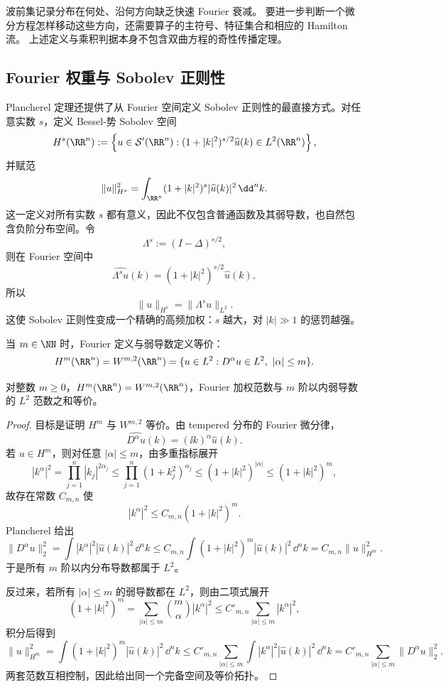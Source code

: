 \begin{note}[波前集与奇性传播的区别]
波前集记录分布在何处、沿何方向缺乏快速 Fourier 衰减。
要进一步判断一个微分方程怎样移动这些方向，还需要算子的主符号、特征集合和相应的 Hamilton 流。
上述定义与乘积判据本身不包含双曲方程的奇性传播定理。
\end{note}

\subsection{Fourier 权重与 Sobolev 正则性}
Plancherel 定理还提供了从 Fourier 空间定义 Sobolev 正则性的最直接方式。对任意实数 $s$，定义 Bessel-势 Sobolev 空间
\begin{equation*}H^s(\RR^n)
:=\left\{u\in\mathcal S'(\RR^n):
(1+|k|^2)^{s/2}\widehat u(k)\in L^2(\RR^n)\right\},\end{equation*}
并赋范
\begin{equation*}{
\|u\|_{H^s}^2
=\int_{\RR^n}(1+|k|^2)^s|\widehat u(k)|^2\,\dd^n k.
}\end{equation*}
这一定义对所有实数 $s$ 都有意义，因此不仅包含普通函数及其弱导数，也自然包含负阶分布空间。令
\[
\Lambda^s:=(I-\Delta)^{s/2},
\]
则在 Fourier 空间中
\[
\widehat{\Lambda^su}(k)
=(1+|k|^2)^{s/2}\widehat u(k),
\]
所以
\[
\|u\|_{H^s}=\|\Lambda^su\|_{L^2}.
\]
这使 Sobolev 正则性变成一个精确的高频加权：$s$ 越大，对 $|k|\gg1$ 的惩罚越强。

当 $m\in\NN$ 时，Fourier 定义与弱导数定义等价：
\begin{equation*}{
H^m(\RR^n)
=W^{m,2}(\RR^n)
=\{u\in L^2:D^\alpha u\in L^2,\ |\alpha|\le m\}.
}\end{equation*}

\begin{theorem}
对整数 $m\ge0$，$H^m(\RR^n)=W^{m,2}(\RR^n)$，Fourier 加权范数与 $m$ 阶以内弱导数的 $L^2$ 范数之和等价。
\end{theorem}
\begin{proof}
目标是证明 $H^m$ 与 $W^{m,2}$ 等价。由 tempered 分布的 Fourier 微分律，
\[
\widehat{D^\alpha u}(k)
=(\ii k)^\alpha\widehat u(k).
\]
若 $u\in H^m$，则对任意 $|\alpha|\le m$，由多重指标展开
\[
|k^\alpha|^2
=\prod_{j=1}^n|k_j|^{2\alpha_j}
\le\prod_{j=1}^n(1+k_j^2)^{\alpha_j}
\le(1+|k|^2)^{|\alpha|}
\le(1+|k|^2)^m,
\]
故存在常数 $C_{m,n}$ 使
\[
|k^\alpha|^2
\le C_{m,n}(1+|k|^2)^m.
\]
Plancherel 给出
\[
\|D^\alpha u\|_2^2
=\int|k^\alpha|^2|\widehat u(k)|^2\,\dd^n k
\le C_{m,n}\int(1+|k|^2)^m|\widehat u(k)|^2\,\dd^n k
=C_{m,n}\|u\|_{H^m}^2.
\]
于是所有 $m$ 阶以内分布导数都属于 $L^2$。

反过来，若所有 $|\alpha|\le m$ 的弱导数都在 $L^2$，则由二项式展开
\[
(1+|k|^2)^m
=\sum_{|\alpha|\le m}\binom{m}{\alpha}|k^\alpha|^2
\le C'_{m,n}\sum_{|\alpha|\le m}|k^\alpha|^2,
\]
积分后得到
\[
\|u\|_{H^m}^2
=\int(1+|k|^2)^m|\widehat u(k)|^2\,\dd^n k
\le C'_{m,n}\sum_{|\alpha|\le m}\int|k^\alpha|^2|\widehat u(k)|^2\,\dd^n k
=C'_{m,n}\sum_{|\alpha|\le m}\|D^\alpha u\|_2^2.
\]
两套范数互相控制，因此给出同一个完备空间及等价拓扑。
\end{proof}

